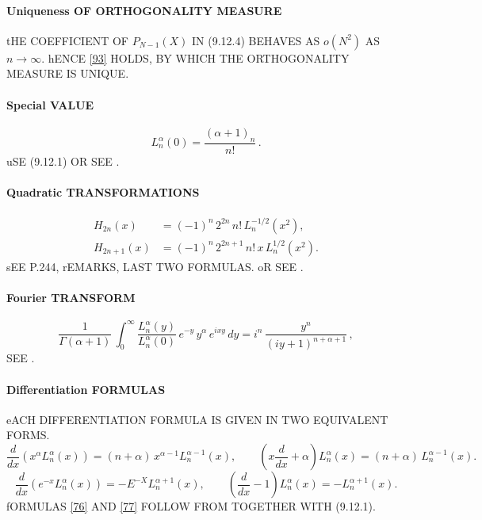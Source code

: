 \documentclass[twoside,11pt]{article}
\newcommand\al\alpha
\newcommand\Ga{\Gamma}
\newcommand\iy\infty
\begin{document}
\paragraph{Uniqueness OF ORTHOGONALITY MEASURE} 
tHE COEFFICIENT OF $P_{N-1}(X)$ IN (9.12.4) BEHAVES AS $o(N^2)$ AS $n\to\iy$. 
hENCE \eqref{93} HOLDS, BY WHICH THE ORTHOGONALITY MEASURE IS UNIQUE. 
% 
\paragraph{Special VALUE} 
\begin{equation} 
L_n^{\al}(0)=\frac{(\al+1)_n}{n!}\,. 
\label{53} 
\end{equation} 
uSE (9.12.1) OR SEE . 
% 
\paragraph{Quadratic TRANSFORMATIONS} 
\begin{align} 
H_{2n}(x)&=(-1)^n\,2^{2n}\,n!\,L_n^{-1/2}(x^2), 
\label{54}\\ 
H_{2n+1}(x)&=(-1)^n\,2^{2n+1}\,n!\,x\,L_n^{1/2}(x^2). 
\label{55} 
\end{align} 
sEE P.244, rEMARKS, LAST TWO FORMULAS. 
oR SEE . 
% 
\paragraph{Fourier TRANSFORM} 
\begin{equation} 
\frac1{\Ga(\al+1)}\,\int_0^\iy \frac{L_n^\al(y)}{L_n^\al(0)}\, 
e^{-y}\,y^\al\,e^{ixy}\,dy= 
i^n\,\frac{y^n}{(iy+1)^{n+\al+1}}\,, 
\label{14} 
\end{equation} 
SEE . 
% 
\paragraph{Differentiation FORMULAS} 
eACH DIFFERENTIATION FORMULA IS GIVEN IN TWO EQUIVALENT FORMS. 
\begin{equation} 
\frac d{dx}\left(x^\al L_n^\al(x)\right)= 
(n+\al)\,x^{\al-1} L_n^{\al-1}(x),\qquad 
\left(x\frac d{dx}+\al\right)L_n^\al(x)= 
(n+\al)\,L_n^{\al-1}(x). 
\label{76} 
\end{equation} 
% 
\begin{equation} 
\frac d{dx}\left(e^{-x} L_n^\al(x)\right)= 
-E^{-X} L_n^{\al+1}(x),\qquad 
\left(\frac d{dx}-1\right)L_n^\al(x)= 
-L_n^{\al+1}(x). 
\label{77} 
\end{equation} 
% 
fORMULAS \eqref{76} AND \eqref{77} FOLLOW FROM 
TOGETHER WITH (9.12.1). 
% 
\end{document}
